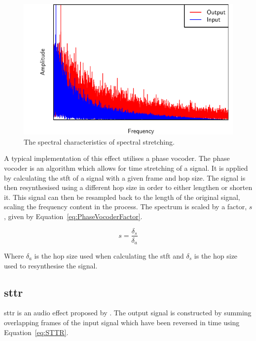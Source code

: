 		\begin{figure}[h!]
			\centering
			\includegraphics{chapter3/Images/SpectralStretchingSpectrum.pdf}
			\caption{The spectral characteristics of spectral stretching.}
			\label{fig:SpectralStretching}
		\end{figure}

		A typical implementation of this effect utilises a phase vocoder. The phase vocoder is an algorithm which
		allows for time stretching of a signal. It is applied by calculating the \acrfull{stft} of a signal with a
		given frame and hop size. The signal is then resynthesised using a different hop size in order to either
		lengthen or shorten it. This signal can then be resampled back to the length of the original signal,
		scaling the frequency content in the process. The spectrum is scaled by a factor, $s$, given by
		Equation~\ref{eq:PhaseVocoderFactor}.

		\begin{equation}
			s = \frac{\delta_{s}}{\delta_{a}}
			\label{eq:PhaseVocoderFactor}
		\end{equation}

		Where $\delta_{a}$ is the hop size used when calculating the \acrshort{stft} and $\delta_{s}$ is the hop
		size used to resynthesise the signal.

	\subsection{\acrlong{sttr}}
	\label{sec:Excitation-Methods-STTR}
		\acrfull{sttr} is an audio effect proposed by \citet{kim2014shorttime}. The output signal is constructed by
		summing overlapping frames of the input signal which have been reversed in time using
		Equation~\ref{eq:STTR}.

